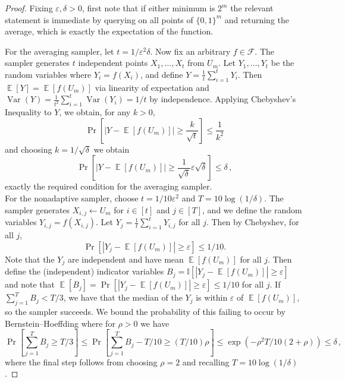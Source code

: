 \documentclass[11pt]{article}
\numberwithin{equation}{section}
\theoremstyle{definition}
\theoremstyle{plain}
\newcommand{\eps}{\varepsilon}
\newcommand{\zo}{\{0,1\}}
\newcommand{\la}{\leftarrow}
\newcommand{\cF}{\mathcal{F}}
\DeclareMathOperator*{\E}{\mathbb{E}}
\newcommand{\var}{\operatorname{Var}}
\begin{document}
\begin{proof}
Fixing $\eps,\delta>0$, first note that if either minimum is $2^m$ the relevant statement is immediate by querying on all points of $\zo^m$ and returning the average, which is exactly the expectation of the function.

For the averaging sampler, let $t=1/\eps^2\delta$. Now fix an arbitrary $f\in \cF$. The sampler generates $t$ independent points $X_1,\ldots,X_t$ from $U_m$. Let $Y_1,\ldots,Y_t$ be the random variables where $Y_i=f(X_i)$, and define $Y=\frac{1}{t}\sum_{i=1}^tY_i$. Then $\E[Y]=\E[f(U_m)]$ via linearity of expectation and $\var(Y)=\frac{1}{t^2}\sum_{i=1}^t\var(Y_i)=1/t$ by independence. Applying Chebyshev's Inequality to $Y$, we %
obtain, %
for any $k>0$,
\[\Pr\left[|Y-\E[f(U_m)]| \geq \frac{k}{\sqrt{t}}\right] \leq \frac{1}{k^2}\]
and choosing $k=1/\sqrt{\delta}$ we obtain
\[\Pr\left[|Y-\E[f(U_m)]| \geq \frac{1}{\sqrt{\delta}}\eps\sqrt{\delta}\right] \leq \delta\,,%
\]
%
exactly the required condition for the averaging sampler.\\

For the nonadaptive sampler, choose $t=1/10\eps^2$ and $T=10\log(1/\delta)$. The sampler generates $X_{i,j}\la U_m$ for $i\in[t]$ and $j\in[T]$, and we %
define the random variables $Y_{i,j}=f(X_{i,j})$. Let $Y_j=\frac{1}{t}\sum_{i=1}^tY_{i,j}$ for all $j$. Then by Chebyshev, for all $j$,
\[\Pr[|Y_j-\E[f(U_m)]| \geq \eps] \leq 1/10.\]
Note that the $Y_j$ are independent and have mean $\E[f(U_m)]$ for all $j$. Then define the (independent) indicator variables $B_j=\mathbb{I}[|Y_j-\E[f(U_m)]|\geq \eps]$ and note that $\E[B_j]=\Pr[|Y_j-\E[f(U_m)]|\geq \eps]\leq 1/10$ for all $j$. If $\sum_{j=1}^TB_j<T/3$, we have that the median of the %
$Y_j$  %
is within $\eps$ of $\E[f(U_m)]$, so the sampler succeeds. We bound the probability of this
failing 
to occur by 
%
Bernstein--Hoeffding
%
%
%
%
%
where for $\rho>0$ we have %
\[\Pr\left[\sum_{j=1}^TB_j\geq T/3\right]\leq \Pr\left[\sum_{j=1}^TB_j - T/10 \geq (T/10)\rho\right] \leq \exp(-\rho^2T/10(2+\rho))\leq \delta\,,\] %
%
where  %
the final step follows from choosing $\rho=2$ and recalling $T=10\log(1/\delta)$.
\end{proof}
\end{document}
